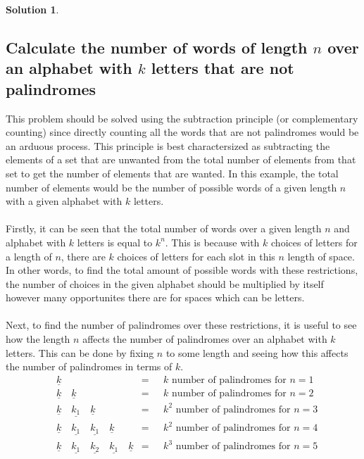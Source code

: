 \documentclass{article}
\theoremstyle{definition}
\newtheorem*{solution}{Solution}
\begin{document}
\begin{solution}
\subsection*{Calculate the number of words of length $n$ over an alphabet with $k$ letters that are not palindromes}
This problem should be solved using the subtraction principle (or complementary counting) since directly counting all the words that are not palindromes would be an arduous process. This principle is best charactersized as subtracting the elements of a set that are unwanted from the total number of elements from that set to get the number of elements that are wanted. In this example, the total number of elements would be the number of possible words of a given length $n$ with a given alphabet with $k$ letters.\\\\
Firstly, it can be seen that the total number of words over a given length $n$ and alphabet with $k$ letters is equal to $k^n$. This is because with $k$ choices of letters for a length of $n$, there are $k$ choices of letters for each slot in this $n$ length of space. In other words, to find the total amount of possible words with these restrictions, the number of choices in the given alphabet should be multiplied by itself however many opportunites there are for spaces which can be letters.\\\\
Next, to find the number of palindromes over these restrictions, it is useful to see how the length $n$ affects the number of palindromes over an alphabet with $k$ letters. This can be done by fixing $n$ to some length and seeing how this affects the number of palindromes in terms of $k$.
\begin{align*}
&\underline{k} \quad  &= \mbox{ }&k \mbox{ number of palindromes for $n = 1$}\\
&\underline{k} \quad \underline{k} \quad  &= \mbox{ }&k \mbox{ number of palindromes for $n = 2$}\\
&\underline{k} \quad \underline{k_1} \quad \underline{k}  &= \mbox{ }&k^2 \mbox{ number of palindromes for $n = 3$}\\
&\underline{k} \quad \underline{k_1} \quad \underline{k_1} \quad \underline{k} &= \mbox{ }&k^2 \mbox{ number of palindromes for $n = 4$}\\
&\underline{k} \quad \underline{k_1} \quad \underline{k_2} \quad \underline{k_1} \quad \underline{k} &= \mbox{ } &k^3 \mbox{ number of palindromes for $n=5$}
\end{align*}

\end{solution}
\end{document}

